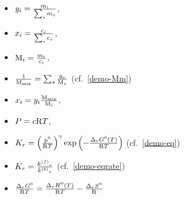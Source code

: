 \begin{itemize}
\item $\massfrac[i] = \frac{\mass[i]}{\sum_s \mass[s]}$,
\item $\molarfrac[i] = \frac{\molar[i]}{\sum_s \molar[s]}$,
\item $\Mm[i] = \frac{\mass[i]}{\molar[i]}$,
\item $\frac{1}{\Mm[\text{mix}]} = \sum_s \frac{\massfrac[s]}{\Mm[s]}$ (cf.~\ref{demo-Mm})
\item $\molarfrac[i] = \massfrac[i] \frac{\Mm[\text{mix}]}{\Mm[i]}$,
\item $P = \molar\Rg T$,
\item $\Eqconst[r] = \left(\frac{\pz}{\Rg T}\right)^\gamma \exp\left(-\frac{\DgibbsZ[r](T)}{\Rg T}\right)$ (cf.~\ref{demo-eq})
\item $\Eqconst[r] = \frac{\fwdrate[r]}{\bkwdrate[r]}$ (cf.~\ref{demo-eqrate})
\item $\frac{\DgibbsZ[r]}{\Rg T} = \frac{\DenthZ[r](T)}{\Rg T} - \frac{\DentrZ[r]}{\Rg}$
\end{itemize}

